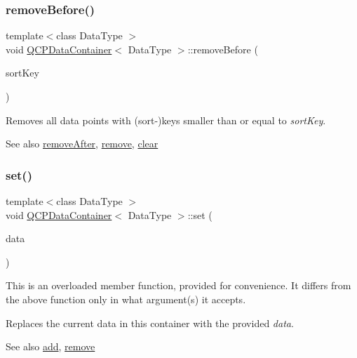 \subsubsection{\texorpdfstring{remove\+Before()}{removeBefore()}}
{\footnotesize\ttfamily template$<$class Data\+Type $>$ \\
void \hyperlink{class_q_c_p_data_container}{Q\+C\+P\+Data\+Container}$<$ Data\+Type $>$\+::remove\+Before (\begin{DoxyParamCaption}\item[{double}]{sort\+Key }\end{DoxyParamCaption})}

Removes all data points with (sort-\/)keys smaller than or equal to {\itshape sort\+Key}.

\begin{DoxySeeAlso}{See also}
\hyperlink{class_q_c_p_data_container_abbe5d87ffc10b5aeffa5bb42cf03aa3c}{remove\+After}, \hyperlink{class_q_c_p_data_container_ae5f569a120648b167efa78835f12fd38}{remove}, \hyperlink{class_q_c_p_data_container_a7e2b29736c6fd761649bda1a54ba967f}{clear} 
\end{DoxySeeAlso}
\mbox{\label{class_q_c_p_data_container_ae7042bd534fc3ce7befa2ce3f790b5bf}} 
\subsubsection{\texorpdfstring{set()}{set()}\hspace{0.1cm}{\footnotesize\ttfamily [1/2]}}
{\footnotesize\ttfamily template$<$class Data\+Type $>$ \\
void \hyperlink{class_q_c_p_data_container}{Q\+C\+P\+Data\+Container}$<$ Data\+Type $>$\+::set (\begin{DoxyParamCaption}\item[{const \hyperlink{class_q_c_p_data_container}{Q\+C\+P\+Data\+Container}$<$ Data\+Type $>$ \&}]{data }\end{DoxyParamCaption})}

This is an overloaded member function, provided for convenience. It differs from the above function only in what argument(s) it accepts.

Replaces the current data in this container with the provided {\itshape data}.

\begin{DoxySeeAlso}{See also}
\hyperlink{class_q_c_p_data_container_a42b98bd994307ccd163a43d576f91ad9}{add}, \hyperlink{class_q_c_p_data_container_ae5f569a120648b167efa78835f12fd38}{remove} 
\end{DoxySeeAlso}
\mbox{\label{class_q_c_p_data_container_aff99fffbb26597a354c4bc8312596ab2}} 
